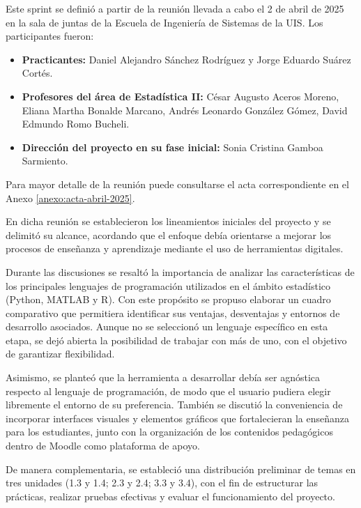 \documentclass[letter,oneside,12pt,spanish]{report}
\begin{document}
Este sprint se definió a partir de la reunión llevada a cabo el 2 de abril de 2025 en la sala de juntas de la Escuela de Ingeniería de Sistemas de la UIS. Los participantes fueron:

\begin{itemize}
	\item \textbf{Practicantes:} Daniel Alejandro Sánchez Rodríguez y Jorge Eduardo Suárez Cortés.
	\item \textbf{Profesores del área de Estadística II:} César Augusto Aceros Moreno, Eliana Martha Bonalde Marcano, Andrés Leonardo González Gómez, David Edmundo Romo Bucheli.
	\item \textbf{Dirección del proyecto en su fase inicial:} Sonia Cristina Gamboa Sarmiento.
\end{itemize}

\noindent Para mayor detalle de la reunión puede consultarse el acta correspondiente en el Anexo \ref{anexo:acta-abril-2025}.

En dicha reunión se establecieron los lineamientos iniciales del proyecto y se delimitó su alcance, acordando que el enfoque debía orientarse a mejorar los procesos de enseñanza y aprendizaje mediante el uso de herramientas digitales.  

Durante las discusiones se resaltó la importancia de analizar las características de los principales lenguajes de programación utilizados en el ámbito estadístico (Python, MATLAB y R). Con este propósito se propuso elaborar un cuadro comparativo que permitiera identificar sus ventajas, desventajas y entornos de desarrollo asociados. Aunque no se seleccionó un lenguaje específico en esta etapa, se dejó abierta la posibilidad de trabajar con más de uno, con el objetivo de garantizar flexibilidad.  

Asimismo, se planteó que la herramienta a desarrollar debía ser agnóstica respecto al lenguaje de programación, de modo que el usuario pudiera elegir libremente el entorno de su preferencia. También se discutió la conveniencia de incorporar interfaces visuales y elementos gráficos que fortalecieran la enseñanza para los estudiantes, junto con la organización de los contenidos pedagógicos dentro de Moodle como plataforma de apoyo.  

De manera complementaria, se estableció una distribución preliminar de temas en tres unidades (1.3 y 1.4; 2.3 y 2.4; 3.3 y 3.4), con el fin de estructurar las prácticas, realizar pruebas efectivas y evaluar el funcionamiento del proyecto.  
\end{document}
